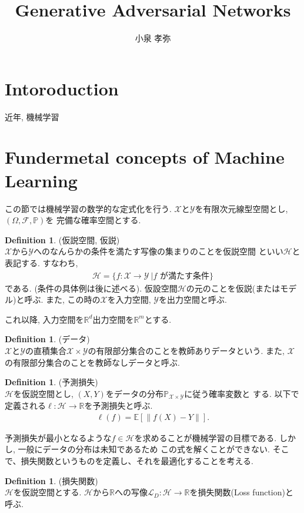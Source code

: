 \documentclass[11pt, a4paper, dvipdfmx]{jsarticle}
\title{Generative Adversarial Networks}
\author{小泉 孝弥}
\date{}
\theoremstyle{definition}
\newtheorem{Definition+}[Axiom+]{Definition}
\newcommand{\R}{\mathbb{R}}
\newcommand{\F}{\mathcal{F}}
\newcommand{\X}{\mathcal{X}}
\newcommand{\Y}{\mathcal{Y}}
\newcommand{\Hil}{\mathcal{H}}
\newcommand{\Loss}{\mathcal{L}_{D}}
\renewcommand{\P}{\mathbb{P}}
\newcommand{\Probsp}{(\Omega, \F, \P)}
\begin{document}
\maketitle
\section{Intoroduction}
近年, 機械学習
\section{Fundermetal concepts of Machine Learning}
この節では機械学習の数学的な定式化を行う. $\X$と$\Y$を有限次元線型空間とし, $\Probsp$を
完備な確率空間とする.
\begin{Definition+}(仮説空間, 仮説)\\
    $\X$から$\Y$へのなんらかの条件を満たす写像の集まりのことを仮説空間
    といい$\Hil$と表記する. すなわち,
    \begin{align*}
        \Hil = \{f:\X\to\Y~| f\text{ が満たす条件}\}
    \end{align*}
    である. (条件の具体例は後に述べる). 仮設空間$\Hil$の元のことを仮説(またはモデル)と呼ぶ.
    また, この時の$\X$を入力空間, $\Y$を出力空間と呼ぶ. 
\end{Definition+}
これ以降, 入力空間を$\R^{d}$出力空間を$\R^{m}$とする.
\begin{Definition+}(データ)\\
    $\X$と$\Y$の直積集合$\X\times\Y$の有限部分集合のことを教師ありデータという.
    また, $\X$の有限部分集合のことを教師なしデータと呼ぶ. 
\end{Definition+}
\begin{Definition+}(予測損失)\\
    $\Hil$を仮説空間とし, $(X, Y)$をデータの分布$\mathbb{P}_{\X\times\Y}$に従う確率変数と
    する. 以下で定義される$\ell:\Hil\to\R$を予測損失と呼ぶ.
    \begin{align*}
        \ell(f) = \mathbb{E}[\|f(X) - Y\|].
    \end{align*}
\end{Definition+}
予測損失が最小となるような$f\in\Hil$を求めることが機械学習の目標である. しかし, 一般にデータの分布は未知であるため
この式を解くことができない. そこで、損失関数というものを定義し、それを最適化することを考える.
\begin{Definition+}(損失関数)\\
    $\Hil$を仮説空間とする. $\Hil$から$\R$への写像$\Loss:\Hil\to\R$を損失関数(Loss function)と呼ぶ.
\end{Definition+}
\end{document}
